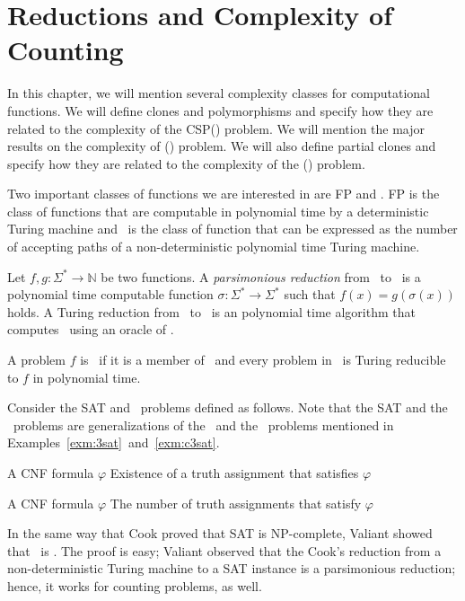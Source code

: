 \chapter{Reductions and Complexity of Counting}
In this chapter, we will mention several complexity classes for computational functions.
We will define clones and polymorphisms and specify how they are related to
the complexity of the CSP(\mrelset) problem. We will mention the major results on the complexity of 
\ccsp(\mrelset) problem. We will also define partial clones and specify
how they are related to the complexity of the \ccsp(\mrelset) problem.

Two important classes of functions we are interested in are FP and \cp\@.
FP is the class of functions that are computable in polynomial time by a deterministic Turing machine
and \cp\ is the class of function that can be expressed as the
number of accepting paths of a non-deterministic polynomial time Turing machine. 

Let \(f,g:\Sigma^*\to\mathbb{N}\) be two functions. A \emph{parsimonious reduction}
from \mf\ to \mg\ is a polynomial time computable function
\(\sigma:\Sigma^*\to\Sigma^*\) such that
\(f(x)=g(\sigma(x))\) holds. 
A Turing reduction from \mf\ to \mg\ is an polynomial time algorithm
that computes \mf\ using an oracle of \mg\@.

\begin{defi} 
A problem \(f\) is \cpc\ if it is a member of \cp\ and every problem in \cp\ is 
Turing reducible to \(f\) in polynomial time.
\end{defi}

Consider the SAT and \csat\ problems defined as follows.
Note that the SAT and the \csat\ problems are generalizations of the \tsat\ and
the \ctsat\ problems
mentioned in Examples~\ref{exm:3sat}~and~\ref{exm:c3sat}\@. 

{A CNF formula \(\varphi\)}
{Existence of a truth assignment that satisfies \(\varphi\)}

\pdef{\csat}
{A CNF formula \(\varphi\)}
{The number of truth assignments that satisfy \(\varphi\)}

In the same way that Cook \cite{cook1971} proved that SAT is NP-complete,
Valiant \cite{Valiant1979} showed that \csat\ is \cpc\@. 
The proof is easy; Valiant observed that the Cook's reduction from a non-deterministic Turing machine
to a SAT instance is a parsimonious reduction; hence, it works for counting problems, as well. 

